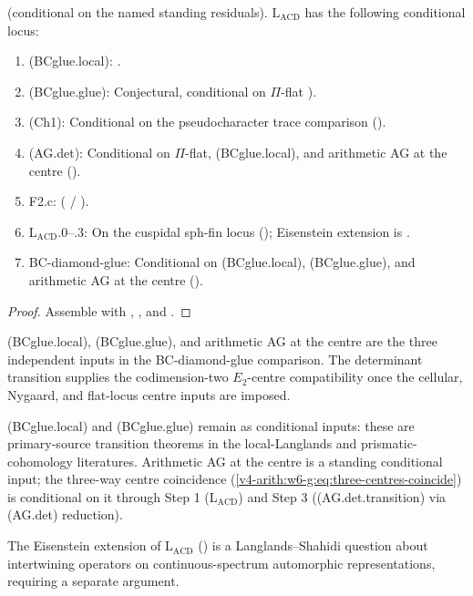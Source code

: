 \begin{theorem}
\label{v4-arith:w6-g:thm:lacd-wave6}
\ClaimStatusConjectured (conditional on the named standing residuals).
\(\mathrm{L}_{\mathrm{ACD}}\) has the following conditional locus:
\begin{enumerate}
\item (BCglue.local):
.
\item (BCglue.glue): Conjectural, conditional on \(\Pi\)-flat
).
\item (Ch1): Conditional on the pseudocharacter trace comparison
().
\item (AG.det): Conditional on \(\Pi\)-flat, (BCglue.local),
and arithmetic AG at the centre
().
\item F2.c:
( /
).
\item L\(_{\mathrm{ACD}}\).\(0\)--.\(3\): On the cuspidal sph-fin
locus (); Eisenstein extension
is .
\item BC-diamond-glue: Conditional on
(BCglue.local), (BCglue.glue), and arithmetic AG at the centre
().
\end{enumerate}
\end{theorem}

\begin{proof}
Assemble  with
,
, and
.
\end{proof}

\begin{remark}
\label{v4-arith:w6-g:rem:domain-delta}
(BCglue.local), (BCglue.glue), and arithmetic AG at the centre are the
three independent inputs in the BC-diamond-glue comparison. The
determinant transition supplies the codimension-two \(E_{2}\)-centre
compatibility once the cellular, Nygaard, and flat-locus centre inputs
are imposed.
\end{remark}

\begin{remark}
\label{v4-arith:w6-g:rem:what-wave6-cannot-touch}
(BCglue.local) and (BCglue.glue) remain as conditional inputs:
these are primary-source transition theorems in the local-Langlands and
prismatic-cohomology literatures. Arithmetic AG at the
centre is a standing conditional input; the
three-way centre coincidence
(\ref{v4-arith:w6-g:eq:three-centres-coincide}) is conditional on
it through Step 1 (L\(_{\mathrm{ACD}}\)) and Step 3
((AG.det.transition) via (AG.det) reduction).

The Eisenstein extension of
\(\mathrm{L}_{\mathrm{ACD}}\)
() is a
Langlands--Shahidi question about intertwining operators on
continuous-spectrum automorphic representations, requiring a
separate argument.
\end{remark}

